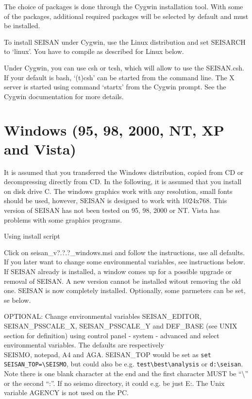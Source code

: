 The choice of packages is done through the Cygwin installation tool. With some of the packages, additional required packages will be selected by default and must be installed. 

To install SEISAN under Cygwin, use the Linux distribution and set SEISARCH to `linux'. You have to compile as described for Linux below. 

Under Cygwin, you can use csh or tcsh, which will allow to use the SEISAN.csh. If your default is bash, `(t)csh' can be started from the command line. The X server is started using command `startx' from 
the Cygwin prompt. See the Cygwin documentation for more details. 

\section{Windows (95, 98, 2000, NT, XP and Vista)} 

It is assumed that you transferred the Windows distribution, copied from CD or decompressing directly from CD. In the following, it is assumed that you install on disk drive C. The windows graphics work with any resolution, small fonts should be used, however, SEISAN is designed to work with 1024x768. This version of SEISAN has not been tested on 95, 98, 2000 or NT. Vista has problems with some graphics programs. 

Using install script 

Click on seisan\_v?.?.?\_windows.msi and follow the instructions, use all defaults. If you later want to change some environmental variables, see instructions below. If SEISAN already is installed, a window comes up for a possible upgrade or removal of SEISAN. A new version cannot be installed witout removing the old one. SEISAN is now completely installed. Optionally, some parmeters can be set, se below. 

OPTIONAL: Change environmental variables SEISAN\_EDITOR, SEISAN\_PSSCALE\_X, \newline
SEISAN\_PSSCALE\_Y and DEF\_BASE (see UNIX section for definition) 
using control panel - system - advanced and select environmental 
variables. The defaults are respectively \\SEISMO, notepad, A4 and AGA. 
SEISAN\_TOP would be set as \texttt{set SEISAN\_TOP=\textbackslash SEISMO}, 
but could also be e.g. \texttt{test\textbackslash best\textbackslash analysis} 
or \texttt{d:\textbackslash seisan}. 
Note there is one blank character at the end and the first character 
MUST be ``\textbackslash '' or the second ``:''. 
If no seismo directory, it could e.g. be just E:. 
The Unix variable AGENCY is not used on the PC. 

